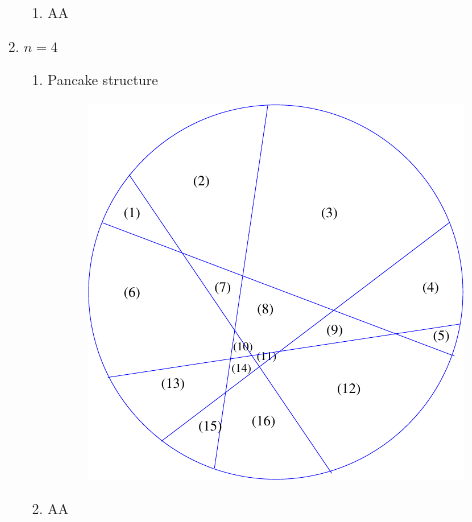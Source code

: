 \documentclass[a4paper,10pt]{article}
\begin{document}
\begin{enumerate}
\begin{enumerate}
    \item AA\\
    
  \end{enumerate}
  \item $n = 4$\\
  \begin{enumerate}
    \item Pancake structure\\
      \begin{figure}[h!]
			\includegraphics[scale=0.3]{graphics/pancakecut16}
			\captionsetup{labelformat=empty}
			\caption{}
			\label{fig:pancakecut16}
		\end{figure}
    \item AA\\
      
  \end{enumerate}
\end{enumerate}
\end{document}
